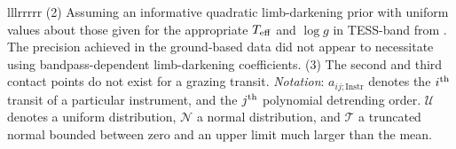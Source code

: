 \begin{deluxetable*}{lllrrrrr}
{%
%
(2) Assuming an informative quadratic limb-darkening prior with
uniform values about those given for the appropriate $T_{\rm eff}$ and
$\log g$ in TESS-band from \citet{claret_limb_2017}.  The precision
achieved in the ground-based data did not appear to necessitate using
bandpass-dependent limb-darkening coefficients.
(3) The second and third contact points do not exist for a grazing transit.
{\it Notation}:
$a_{ij;\mathrm{Instr}}$ denotes the $i^{\rm th}$ transit of a
particular instrument, and the $j^{\rm th}$ polynomial detrending
order.
$\mathcal{U}$ denotes a uniform distribution,
$\mathcal{N}$ a normal distribution, and
$\mathcal{T}$ a truncated normal bounded between zero and an upper limit much larger than the mean.
}
\vspace{-0.3cm}
\end{deluxetable*}
